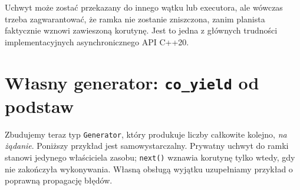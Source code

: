 Uchwyt może zostać przekazany do innego wątku lub executora, ale
wówczas trzeba zagwarantować, że ramka nie zostanie zniszczona,
zanim planista faktycznie wznowi zawieszoną korutynę. Jest to jedna
z głównych trudności implementacyjnych asynchronicznego API C++20.

\section{Własny generator: \texttt{co\_yield} od podstaw}
\label{sec:cpp15-generator}

Zbudujemy teraz typ \texttt{Generator}, który produkuje liczby całkowite
kolejno, \emph{na żądanie}. Poniższy przykład jest samowystarczalny.
Prywatny uchwyt do ramki stanowi jedynego właściciela zasobu;
\texttt{next()} wznawia korutynę tylko wtedy, gdy nie zakończyła
wykonywania. Własną obsługą wyjątku uzupełniamy przykład o
poprawną propagację błędów.

